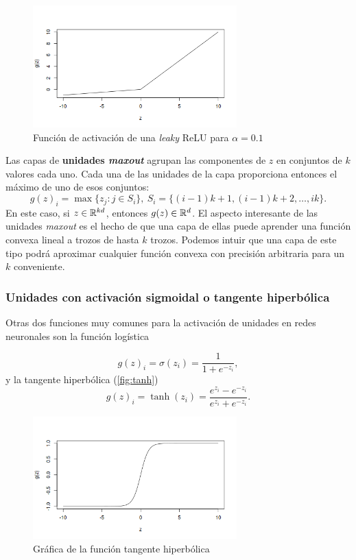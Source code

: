 \begin{figure}[hbtp]
  \centering
  \includegraphics[width=0.7\textwidth]{images/leaky.png}
  \caption[Leaky ReLU]{Función de activación de una \emph{leaky} ReLU para $\alpha=0.1$}
  \label{fig:leaky}
\end{figure}

Las capas de \textbf{unidades \emph{maxout}} agrupan las componentes de
\(z\) en conjuntos de \(k\) valores cada uno. Cada una de las unidades
de la capa proporciona entonces el máximo de uno de esos conjuntos:
\[g(z)_i=\max\{z_j:j\in S_i\},\ S_i=\{(i-1)k + 1, (i-1)k + 2,\dots, ik\}.\]
En este caso, si \(z\in\mathbb{R}^{kd}\), entonces \(g(z)\in\mathbb{R}^{d}\). El
aspecto interesante de las unidades \emph{maxout} es el hecho de que una
capa de ellas puede aprender una función convexa lineal a trozos de
hasta \(k\) trozos. Podemos intuir que una capa de este tipo podrá
aproximar cualquier función convexa con precisión arbitraria para un
\(k\) conveniente.

\subsubsection{Unidades con activación sigmoidal o tangente
hiperbólica}\label{unidades-con-activaciuxf3n-sigmoidal-o-tangente-hiperbuxf3lica}

Otras dos funciones muy comunes para la activación de unidades en redes
neuronales son la función logística

\begin{equation}
  g(z)_i=\sigma(z_i)=\frac{1}{1+e^{-z_i}},
\end{equation}
y la tangente hiperbólica (\autoref{fig:tanh})
\begin{equation}
  g(z)_i=\tanh(z_i)=\frac{e^{z_i}-e^{-z_i}}{e^{z_i}+e^{-z_i}}.
\end{equation}

\begin{figure}[hbtp]
  \centering
  \includegraphics[width=0.7\textwidth]{images/tanh.png}
  \caption[$\tanh$]{Gráfica de la función tangente hiperbólica}
  \label{fig:tanh}
\end{figure}

